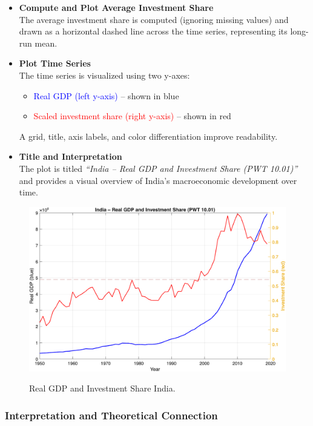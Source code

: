 \documentclass[12pt,a4paper,notitlepage]{article}
\numberwithin{equation}{section}
\begin{document}
\begin{itemize}
\begin{itemize}
    \item \textbf{Compute and Plot Average Investment Share} \\
    The average investment share is computed (ignoring missing values) and drawn as a horizontal dashed line across the time series, representing its long-run mean.

    \item \textbf{Plot Time Series} \\
    The time series is visualized using two y-axes:
    \begin{itemize}
        \item \textcolor{blue}{Real GDP (left y-axis)} – shown in blue
        \item \textcolor{red}{Scaled investment share (right y-axis)} – shown in red
    \end{itemize}
    A grid, title, axis labels, and color differentiation improve readability.

    \item \textbf{Title and Interpretation} \\
    The plot is titled \textit{“India – Real GDP and Investment Share (PWT 10.01)”} and provides a visual overview of India’s macroeconomic development over time.
\end{itemize}

\begin{figure} [H]
	\centering
	\includegraphics[width = 1 \textwidth]{GDP-I.India.png}
	\label{fig:locally}
	\caption{Real GDP and Investment Share India.}
\end{figure}

\subsubsection{   Interpretation and Theoretical Connection}


\end{itemize}
\end{document}
